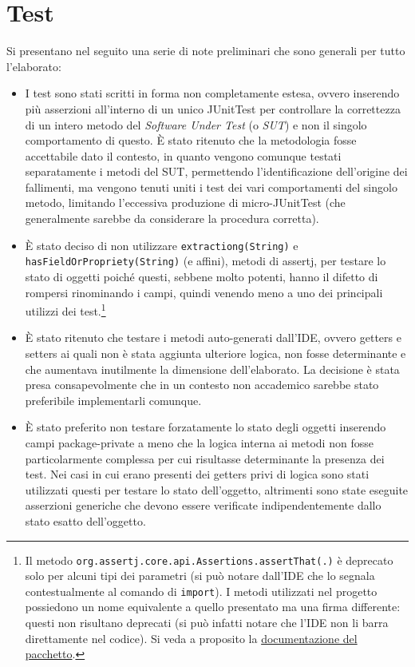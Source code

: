 \documentclass[a4paper,11pt]{article}
\begin{document}
	\section{Test}
	Si presentano nel seguito una serie di note preliminari che sono generali per tutto l'elaborato:
	\begin{itemize}\setlength\itemsep{-3pt}
		\item I test sono stati scritti in forma non completamente estesa, ovvero inserendo più asserzioni all'interno di un unico JUnitTest per controllare la correttezza di un intero metodo del \textit{Software Under Test} (o \textit{SUT}) e non il singolo comportamento di questo. È stato ritenuto che la metodologia fosse accettabile dato il contesto, in quanto vengono comunque testati separatamente i metodi del SUT, permettendo l'identificazione dell'origine dei fallimenti, ma vengono tenuti uniti i test dei vari comportamenti del singolo metodo, limitando l'eccessiva produzione di micro-JUnitTest (che generalmente sarebbe da considerare la procedura corretta).
		\item È stato deciso di non utilizzare \texttt{extractiong(String)} e \texttt{hasFieldOrPropriety(String)} (e affini), metodi di assertj, per testare lo stato di oggetti poiché questi, sebbene molto potenti, hanno il difetto di rompersi rinominando i campi, quindi venendo meno a uno dei principali utilizzi dei test.\footnote{Il metodo \texttt{org.assertj.core.api.Assertions.assertThat(.)} è deprecato solo per alcuni tipi dei parametri (si può notare dall'IDE che lo segnala contestualmente al comando di \texttt{import}). I metodi utilizzati nel progetto possiedono un nome equivalente a quello presentato ma una firma differente: questi non risultano deprecati (si può infatti notare che l'IDE non li barra direttamente nel codice). Si veda a proposito la \href{https://www.javadoc.io/doc/org.assertj/assertj-core/latest/org/assertj/core/api/Assertions.html}{documentazione del pacchetto}.}
		\item È stato ritenuto che testare i metodi auto-generati dall'IDE, ovvero getters e setters ai quali non è stata aggiunta ulteriore logica, non fosse determinante e che aumentava inutilmente la dimensione dell'elaborato. La decisione è stata presa consapevolmente che in un contesto non accademico sarebbe stato preferibile implementarli comunque.
		\item È stato preferito non testare forzatamente lo stato degli oggetti inserendo campi package-private a meno che la logica interna ai metodi non fosse particolarmente complessa per cui risultasse determinante la presenza dei test. Nei casi in cui erano presenti dei getters privi di logica sono stati utilizzati questi per testare lo stato dell'oggetto, altrimenti sono state eseguite asserzioni generiche che devono essere verificate indipendentemente dallo stato esatto dell'oggetto.
	\end{itemize}
	
	
	
\end{document}
